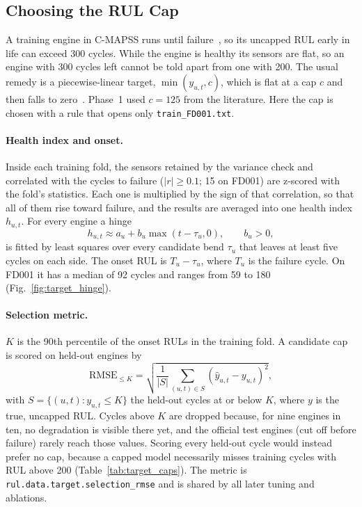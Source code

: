
\subsection{Choosing the RUL Cap}
\label{sec:target}

A training engine in C-MAPSS runs until failure~\cite{Saxena2008damage},
so its uncapped RUL early in life can exceed 300 cycles. While the engine is
healthy its sensors are flat, so an engine with 300 cycles left cannot be told
apart from one with 200. The usual remedy is a piecewise-linear target,
$\min(y_{u,t},c)$, which is flat at a cap $c$ and then falls to
zero~\cite{Heimes2008recurrent}. Phase~1 used $c=125$ from the literature.
Here the cap is chosen with a rule that opens only \texttt{train\_FD001.txt}.

\paragraph{Health index and onset.}
Inside each training fold, the sensors retained by the variance check and
correlated with the cycles to failure ($|r|\geq0.1$; 15 on FD001) are
z-scored with the fold's statistics. Each one is multiplied by the sign of
that correlation, so that all of them rise toward failure, and the results
are averaged into one health index $h_{u,t}$. For every engine a hinge
\begin{equation}
 h_{u,t}\approx a_u+b_u\max(t-\tau_u,0),\qquad b_u>0,
\end{equation}
is fitted by least squares over every candidate bend $\tau_u$ that leaves at
least five cycles on each side. The onset RUL is $T_u-\tau_u$, where $T_u$ is
the failure cycle. On FD001 it has a median of 92 cycles and ranges from 59 to
180 (Fig.~\ref{fig:target_hinge}).

\paragraph{Selection metric.}
$K$ is the 90th percentile of the onset RULs in the training fold. A
candidate cap is scored on held-out engines by
\begin{equation}
 \mathrm{RMSE}_{\leq K}=\sqrt{\frac{1}{|S|}\sum_{(u,t)\in S}(\hat y_{u,t}-y_{u,t})^2},
\end{equation}
with $S=\{(u,t):y_{u,t}\leq K\}$ the held-out cycles at or below $K$, where $y$ is the true, uncapped RUL. Cycles above $K$ are dropped because, for
nine engines in ten, no degradation is visible there yet, and the official
test engines (cut off before failure) rarely reach those values. Scoring
every held-out cycle would instead prefer no cap, because a capped model
necessarily misses training cycles with RUL above 200
(Table~\ref{tab:target_caps}). The metric is \texttt{rul.data.target.selection\_rmse}
and is shared by all later tuning and ablations.

